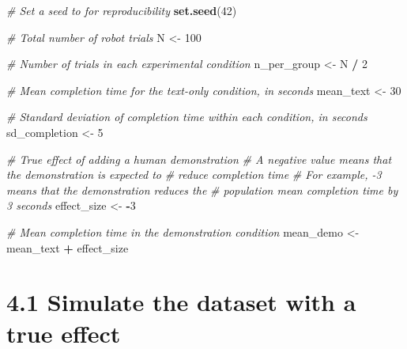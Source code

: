 \documentclass[
]{article}
\newenvironment{Shaded}{\begin{snugshade}}{\end{snugshade}}
\newcommand{\CommentTok}[1]{\textcolor[rgb]{0.56,0.35,0.01}{\textit{#1}}}
\newcommand{\DecValTok}[1]{\textcolor[rgb]{0.00,0.00,0.81}{#1}}
\newcommand{\FunctionTok}[1]{\textcolor[rgb]{0.13,0.29,0.53}{\textbf{#1}}}
\newcommand{\NormalTok}[1]{#1}
\newcommand{\OtherTok}[1]{\textcolor[rgb]{0.56,0.35,0.01}{#1}}
\newcommand{\SpecialCharTok}[1]{\textcolor[rgb]{0.81,0.36,0.00}{\textbf{#1}}}
\begin{document}
\begin{Shaded}
\begin{Highlighting}[]
\CommentTok{\# Set a seed to for reproducibility}
\FunctionTok{set.seed}\NormalTok{(}\DecValTok{42}\NormalTok{)}

\CommentTok{\# Total number of robot trials}
\NormalTok{N }\OtherTok{\textless{}{-}} \DecValTok{100}

\CommentTok{\# Number of trials in each experimental condition}
\NormalTok{n\_per\_group }\OtherTok{\textless{}{-}}\NormalTok{ N }\SpecialCharTok{/} \DecValTok{2}

\CommentTok{\# Mean completion time for the text{-}only condition, in seconds}
\NormalTok{mean\_text }\OtherTok{\textless{}{-}} \DecValTok{30}

\CommentTok{\# Standard deviation of completion time within each condition, in seconds}
\NormalTok{sd\_completion }\OtherTok{\textless{}{-}} \DecValTok{5}

\CommentTok{\# True effect of adding a human demonstration}
\CommentTok{\# A negative value means that the demonstration is expected to}
\CommentTok{\# reduce completion time}
\CommentTok{\# For example, {-}3 means that the demonstration reduces the}
\CommentTok{\# population mean completion time by 3 seconds}
\NormalTok{effect\_size }\OtherTok{\textless{}{-}} \SpecialCharTok{{-}}\DecValTok{3}

\CommentTok{\# Mean completion time in the demonstration condition}
\NormalTok{mean\_demo }\OtherTok{\textless{}{-}}\NormalTok{ mean\_text }\SpecialCharTok{+}\NormalTok{ effect\_size}
\end{Highlighting}
\end{Shaded}

\section{4.1 Simulate the dataset with a true
effect}\label{simulate-the-dataset-with-a-true-effect}
\end{document}
